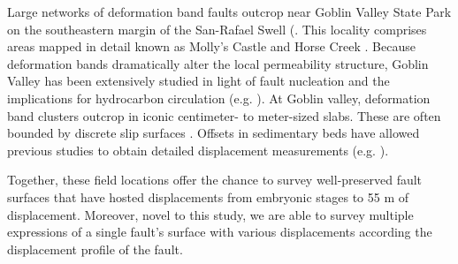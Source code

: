 \documentclass[12pt,a4paper]{article}
\begin{document}
	Large networks of deformation band faults outcrop near Goblin Valley State Park on the southeastern margin of the San-Rafael Swell (\cite{aydin1978development}. This locality comprises areas mapped in detail known as Molly's Castle and Horse Creek \cite{aydin1977faulting}. Because deformation bands dramatically alter the local permeability structure, Goblin Valley has been extensively studied in light of fault nucleation and the implications for hydrocarbon circulation (e.g. \cite{fossen2005fault, torabi2009spatial}). At Goblin valley, deformation band clusters outcrop in iconic centimeter- to meter-sized slabs. These are often bounded by discrete slip surfaces \cite{aydin1978development}. Offsets in sedimentary beds have allowed previous studies to obtain detailed displacement measurements (e.g. \cite{schultz2002displacement}). 
	
	Together, these field locations offer the chance to survey well-preserved fault surfaces that have hosted displacements from embryonic stages to 55 m of displacement. Moreover, novel to this study, we are able to survey multiple expressions of a single fault’s surface with various displacements according the displacement profile of the fault. 

	
\end{document}
